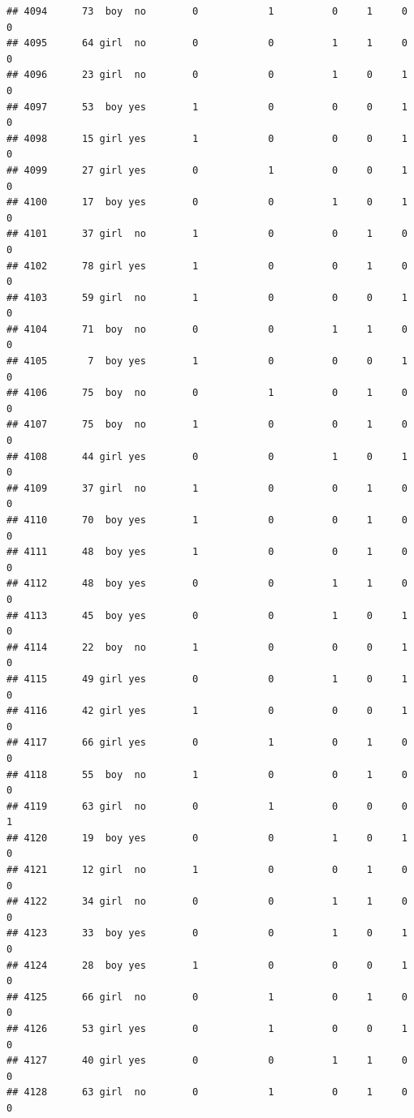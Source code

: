 \documentclass[man]{apa6}
\begin{document}
\begin{verbatim}
## 4094      73  boy  no        0            1          0     1     0     0
## 4095      64 girl  no        0            0          1     1     0     0
## 4096      23 girl  no        0            0          1     0     1     0
## 4097      53  boy yes        1            0          0     0     1     0
## 4098      15 girl yes        1            0          0     0     1     0
## 4099      27 girl yes        0            1          0     0     1     0
## 4100      17  boy yes        0            0          1     0     1     0
## 4101      37 girl  no        1            0          0     1     0     0
## 4102      78 girl yes        1            0          0     1     0     0
## 4103      59 girl  no        1            0          0     0     1     0
## 4104      71  boy  no        0            0          1     1     0     0
## 4105       7  boy yes        1            0          0     0     1     0
## 4106      75  boy  no        0            1          0     1     0     0
## 4107      75  boy  no        1            0          0     1     0     0
## 4108      44 girl yes        0            0          1     0     1     0
## 4109      37 girl  no        1            0          0     1     0     0
## 4110      70  boy yes        1            0          0     1     0     0
## 4111      48  boy yes        1            0          0     1     0     0
## 4112      48  boy yes        0            0          1     1     0     0
## 4113      45  boy yes        0            0          1     0     1     0
## 4114      22  boy  no        1            0          0     0     1     0
## 4115      49 girl yes        0            0          1     0     1     0
## 4116      42 girl yes        1            0          0     0     1     0
## 4117      66 girl yes        0            1          0     1     0     0
## 4118      55  boy  no        1            0          0     1     0     0
## 4119      63 girl  no        0            1          0     0     0     1
## 4120      19  boy yes        0            0          1     0     1     0
## 4121      12 girl  no        1            0          0     1     0     0
## 4122      34 girl  no        0            0          1     1     0     0
## 4123      33  boy yes        0            0          1     0     1     0
## 4124      28  boy yes        1            0          0     0     1     0
## 4125      66 girl  no        0            1          0     1     0     0
## 4126      53 girl yes        0            1          0     0     1     0
## 4127      40 girl yes        0            0          1     1     0     0
## 4128      63 girl  no        0            1          0     1     0     0

\end{verbatim}
\end{document}

